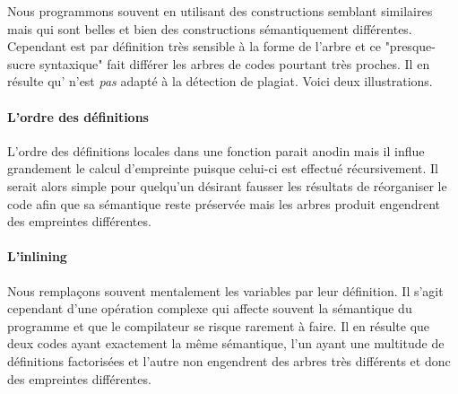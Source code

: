 
Nous programmons souvent en utilisant des constructions semblant
similaires mais qui sont belles et bien des constructions sémantiquement
différentes. Cependant {\Asak} est par définition très sensible à la
forme de l'arbre {\LambdaCode} et ce "presque-sucre syntaxique" fait
différer les arbres de codes pourtant très proches. Il en résulte
qu'{\Asak} n'est \emph{pas} adapté à la détection de plagiat. Voici deux illustrations.

\paragraph{L'ordre des définitions}

L'ordre des définitions locales dans une fonction parait anodin mais il influe grandement le calcul d'empreinte puisque celui-ci est effectué récursivement. Il serait alors simple pour quelqu'un désirant fausser les résultats de réorganiser le code afin que sa sémantique reste préservée mais les arbres {\LambdaCode} produit engendrent des empreintes différentes.

\paragraph{L'inlining}

Nous remplaçons souvent mentalement les variables par leur
définition. Il s'agit cependant d'une opération complexe qui affecte
souvent la sémantique du programme et que le compilateur se risque
rarement à faire. Il en résulte que deux codes ayant exactement la
même sémantique, l'un ayant une multitude de définitions factorisées
et l'autre non engendrent des arbres très différents et donc des empreintes différentes.
